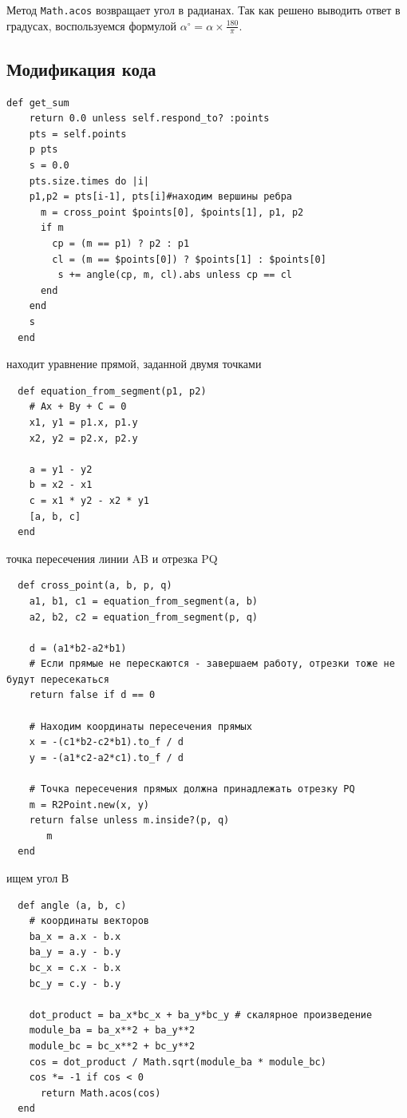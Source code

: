 Метод \verb|Math.acos| возвращает угол в радианах. Так как решено выводить ответ в градусах, воспользуемся формулой $\alpha^\circ = \alpha \times \frac{180}{\pi}$.

\subsection{Модификация кода}

\begin{small}
\begin{verbatim}
def get_sum
	return 0.0 unless self.respond_to? :points
	pts = self.points
	p pts
	s = 0.0
	pts.size.times do |i|
   	p1,p2 = pts[i-1], pts[i]#находим вершины ребра
	  m = cross_point $points[0], $points[1], p1, p2
	  if m
      	cp = (m == p1) ? p2 : p1
      	cl = (m == $points[0]) ? $points[1] : $points[0]
     	 s += angle(cp, m, cl).abs unless cp == cl
	  end
	end
	s
  end
\end{verbatim}
\end{small}

находит уравнение прямой, заданной двумя точками
\begin{small}
\begin{verbatim}
  def equation_from_segment(p1, p2)
    # Ax + By + C = 0
    x1, y1 = p1.x, p1.y
    x2, y2 = p2.x, p2.y

    a = y1 - y2
    b = x2 - x1
    c = x1 * y2 - x2 * y1
    [a, b, c]
  end
\end{verbatim}
\end{small}


точка пересечения линии AB и отрезка PQ
\begin{small}
\begin{verbatim}
  def cross_point(a, b, p, q)
    a1, b1, c1 = equation_from_segment(a, b)
    a2, b2, c2 = equation_from_segment(p, q)

    d = (a1*b2-a2*b1)
    # Если прямые не перескаются - завершаем работу, отрезки тоже не будут пересекаться
    return false if d == 0

    # Находим координаты пересечения прямых
    x = -(c1*b2-c2*b1).to_f / d
    y = -(a1*c2-a2*c1).to_f / d

    # Точка пересечения прямых должна принадлежать отрезку PQ
    m = R2Point.new(x, y)
    return false unless m.inside?(p, q)
       m
  end 
\end{verbatim}
\end{small}

ищем угол В
\begin{small}
\begin{verbatim}
  def angle (a, b, c)
    # координаты векторов
    ba_x = a.x - b.x
    ba_y = a.y - b.y
    bc_x = c.x - b.x
    bc_y = c.y - b.y

    dot_product = ba_x*bc_x + ba_y*bc_y # скалярное произведение
    module_ba = ba_x**2 + ba_y**2
    module_bc = bc_x**2 + bc_y**2
    cos = dot_product / Math.sqrt(module_ba * module_bc)
    cos *= -1 if cos < 0
	  return Math.acos(cos)
  end
\end{verbatim}
\end{small}



